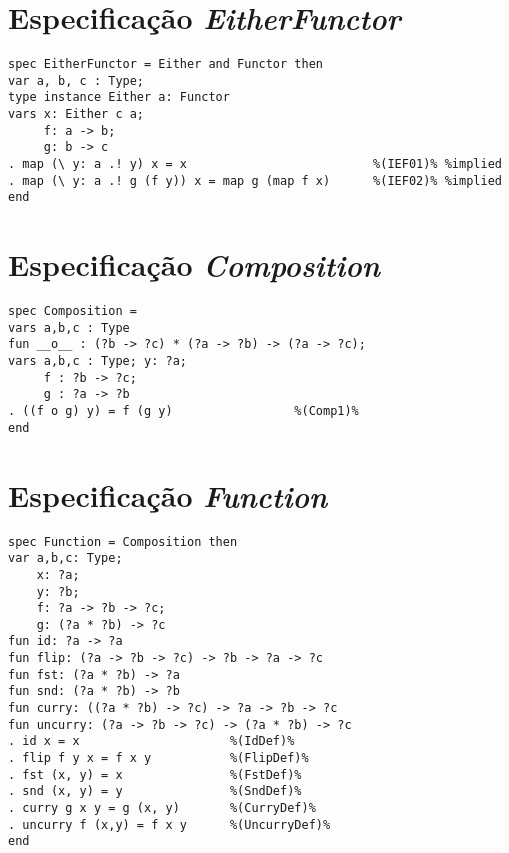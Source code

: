 \section{Especificação \textit{EitherFunctor}}
\label{appendix:lazySpec:eitherFunctor}
\begin{Verbatim}
spec EitherFunctor = Either and Functor then
var a, b, c : Type;
type instance Either a: Functor
vars x: Either c a;  
     f: a -> b;
     g: b -> c
. map (\ y: a .! y) x = x                          %(IEF01)% %implied
. map (\ y: a .! g (f y)) x = map g (map f x)      %(IEF02)% %implied
end
\end{Verbatim}

\section{Especificação \textit{Composition}}
\label{appendix:lazySpec:composition}
\begin{Verbatim}
spec Composition =
vars a,b,c : Type
fun __o__ : (?b -> ?c) * (?a -> ?b) -> (?a -> ?c);
vars a,b,c : Type; y: ?a;
     f : ?b -> ?c; 
     g : ?a -> ?b
. ((f o g) y) = f (g y)                 %(Comp1)%
end
\end{Verbatim}

\section{Especificação \textit{Function}}
\label{appendix:lazySpec:function}
\begin{Verbatim}
spec Function = Composition then
var a,b,c: Type;
    x: ?a;
    y: ?b;   
    f: ?a -> ?b -> ?c;
    g: (?a * ?b) -> ?c
fun id: ?a -> ?a
fun flip: (?a -> ?b -> ?c) -> ?b -> ?a -> ?c
fun fst: (?a * ?b) -> ?a
fun snd: (?a * ?b) -> ?b
fun curry: ((?a * ?b) -> ?c) -> ?a -> ?b -> ?c
fun uncurry: (?a -> ?b -> ?c) -> (?a * ?b) -> ?c
. id x = x                     %(IdDef)%
. flip f y x = f x y           %(FlipDef)%
. fst (x, y) = x               %(FstDef)%
. snd (x, y) = y               %(SndDef)%
. curry g x y = g (x, y)       %(CurryDef)%
. uncurry f (x,y) = f x y      %(UncurryDef)%
end
\end{Verbatim}

